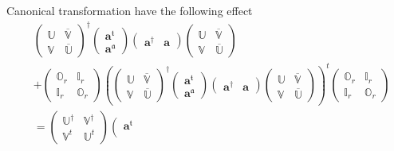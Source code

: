 \documentclass[aps, preprint]{revtex4}
\begin{document}
Canonical transformation have the following effect
\begin{align} & \left (\begin{array}{cc}\mathbb{U} & \overline{\mathbb{V}} \\
\mathbb{V} & \overline{\mathbb{U}}\end{array}\right )^{ \dag } \left (\begin{array}{c}\mathbf{a}^{\mathfrak{t}} \\
\mathbf{a}^{\mathfrak{a}}\end{array}\right ) \left (\begin{array}{cc}\mathbf{a}^{ \dag } & \mathbf{a}\end{array}\right ) \left (\begin{array}{cc}\mathbb{U} & \overline{\mathbb{V}} \\
\mathbb{V} & \overline{\mathbb{U}}\end{array}\right ) \nonumber  \\
 &  +\left (\begin{array}{cc}\mathbb{O}_{r} & \mathbb{I}_{r} \\
\mathbb{I}_{r} & \mathbb{O}_{r}\end{array}\right ) \left (\left (\begin{array}{cc}\mathbb{U} & \overline{\mathbb{V}} \\
\mathbb{V} & \overline{\mathbb{U}}\end{array}\right )^{ \dag } \left (\begin{array}{c}\mathbf{a}^{\mathfrak{t}} \\
\mathbf{a}^{\mathfrak{a}}\end{array}\right ) \left (\begin{array}{cc}\mathbf{a}^{ \dag } & \mathbf{a}\end{array}\right ) \left (\begin{array}{cc}\mathbb{U} & \overline{\mathbb{V}} \\
\mathbb{V} & \overline{\mathbb{U}}\end{array}\right )\right )^{t} \left (\begin{array}{cc}\mathbb{O}_{r} & \mathbb{I}_{r} \\
\mathbb{I}_{r} & \mathbb{O}_{r}\end{array}\right ) \nonumber  \\
 &  =\left (\begin{array}{cc}\mathbb{U}^{ \dag } & \mathbb{V}^{ \dag } \\
\mathbb{V}^{t} & \mathbb{U}^{t}\end{array}\right ) \left (\begin{array}{c}\mathbf{a}^{\mathfrak{t}} \\

\end{array}
\end{align}
\end{document}

